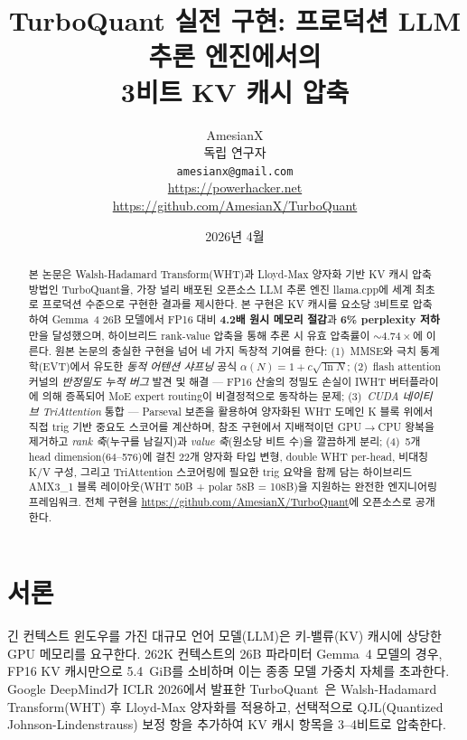 \documentclass[10pt,twocolumn]{article}
\title{TurboQuant 실전 구현: 프로덕션 LLM 추론 엔진에서의\\3비트 KV 캐시 압축}
\author{
AmesianX\\
독립 연구자\\
\texttt{amesianx@gmail.com}\\
\url{https://powerhacker.net}\\
\url{https://github.com/AmesianX/TurboQuant}
}
\date{2026년 4월}
\begin{document}
\maketitle

\begin{abstract}
본 논문은 Walsh-Hadamard Transform(WHT)과 Lloyd-Max 양자화 기반 KV 캐시 압축 방법인 TurboQuant을, 가장 널리 배포된 오픈소스 LLM 추론 엔진 llama.cpp에 세계 최초로 프로덕션 수준으로 구현한 결과를 제시한다. 본 구현은 KV 캐시를 요소당 3비트로 압축하여 Gemma~4 26B 모델에서 FP16 대비 \textbf{4.2배 원시 메모리 절감}과 \textbf{6\% perplexity 저하}만을 달성했으며, 하이브리드 rank-value 압축을 통해 추론 시 유효 압축률이 \textbf{${\sim}4.74\times$}에 이른다. 원본 논문의 충실한 구현을 넘어 네 가지 독창적 기여를 한다: (1)~MMSE와 극치 통계학(EVT)에서 유도한 \emph{동적 어텐션 샤프닝} 공식 $\alpha(N) = 1 + c\sqrt{\ln N}$; (2)~flash attention 커널의 \emph{반정밀도 누적 버그} 발견 및 해결 — FP16 산술의 정밀도 손실이 IWHT 버터플라이에 의해 증폭되어 MoE expert routing이 비결정적으로 동작하는 문제; (3)~\emph{CUDA 네이티브 TriAttention} 통합 — Parseval 보존을 활용하여 양자화된 WHT 도메인 K 블록 위에서 직접 trig 기반 중요도 스코어를 계산하며, 참조 구현에서 지배적이던 GPU$\to$CPU 왕복을 제거하고 \emph{rank 축}(누구를 남길지)과 \emph{value 축}(원소당 비트 수)을 깔끔하게 분리; (4)~5개 head dimension(64--576)에 걸친 22개 양자화 타입 변형, double WHT per-head, 비대칭 K/V 구성, 그리고 TriAttention 스코어링에 필요한 trig 요약을 함께 담는 하이브리드 AMX3\_1 블록 레이아웃(WHT 50B + polar 58B = 108B)을 지원하는 완전한 엔지니어링 프레임워크. 전체 구현을 \url{https://github.com/AmesianX/TurboQuant}에 오픈소스로 공개한다.
\end{abstract}

\section{서론}
\label{sec:intro}

긴 컨텍스트 윈도우를 가진 대규모 언어 모델(LLM)은 키-밸류(KV) 캐시에 상당한 GPU 메모리를 요구한다. 262K 컨텍스트의 26B 파라미터 Gemma~4 모델의 경우, FP16 KV 캐시만으로 5.4~GiB를 소비하며 이는 종종 모델 가중치 자체를 초과한다. Google DeepMind가 ICLR 2026에서 발표한 TurboQuant~\cite{turboquant2026}은 Walsh-Hadamard Transform(WHT) 후 Lloyd-Max 양자화를 적용하고, 선택적으로 QJL(Quantized Johnson-Lindenstrauss) 보정 항을 추가하여 KV 캐시 항목을 3--4비트로 압축한다.
\end{document}
